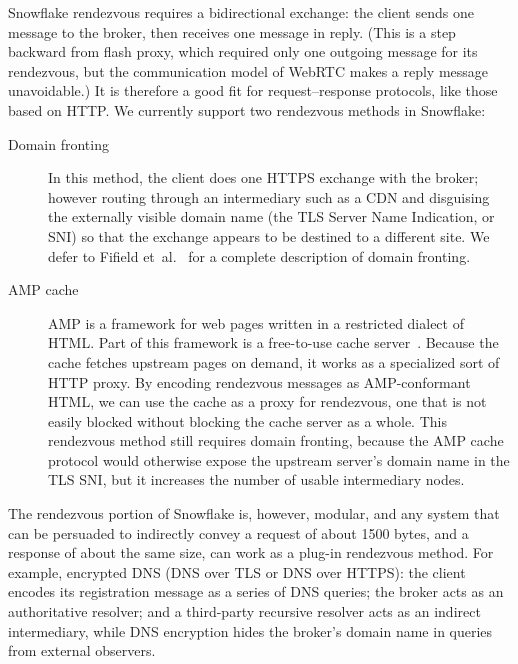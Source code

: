 \documentclass[letterpaper,twocolumn]{article}
\begin{document}
Snowflake rendezvous requires a bidirectional exchange:
the client sends one message to the broker, then receives
one message in reply.
(This is a step backward from flash proxy,
which required only one outgoing message for its rendezvous,
but the communication model of WebRTC makes a reply message unavoidable.)
It is therefore a good fit for request--response protocols,
like those based on HTTP.
We currently support two rendezvous methods in Snowflake:

\begin{description}
\item[Domain fronting]
In this method, the client does one HTTPS exchange
with the broker; however routing through an intermediary such as a CDN
and disguising the externally visible domain name
(the TLS Server Name Indication, or SNI) so that the exchange
appears to be destined to a different site.
We defer to Fifield et~al.~\cite{Fifield2015a}
for a complete description of domain fronting.
\item[AMP cache]
AMP is a framework for web pages written in a restricted dialect of HTML.
Part of this framework is a free-to-use
cache server~\cite{amp-cache}.
Because the cache fetches upstream pages on demand,
it works as a specialized sort of HTTP proxy.
By encoding rendezvous messages as AMP-conformant HTML,
we can use the cache as a proxy for rendezvous,
one that is not easily blocked without blocking the cache server as a whole.
This rendezvous method still requires domain fronting,
because the AMP cache protocol would otherwise expose the
upstream server's domain name in the TLS SNI,
but it increases the number of usable intermediary nodes.
\end{description}

The rendezvous portion of Snowflake is, however, modular,
and any system that can be persuaded to indirectly convey a request
of about 1500 bytes, and a response of about the same size,
can work as a plug-in rendezvous method.
For example, encrypted DNS
(DNS over TLS or DNS over HTTPS):
the client encodes its registration message as a series of DNS queries;
the broker acts as an authoritative resolver;
and a third-party recursive resolver acts as an indirect intermediary,
while DNS encryption hides the broker's domain name in queries
from external observers.
\end{document}
